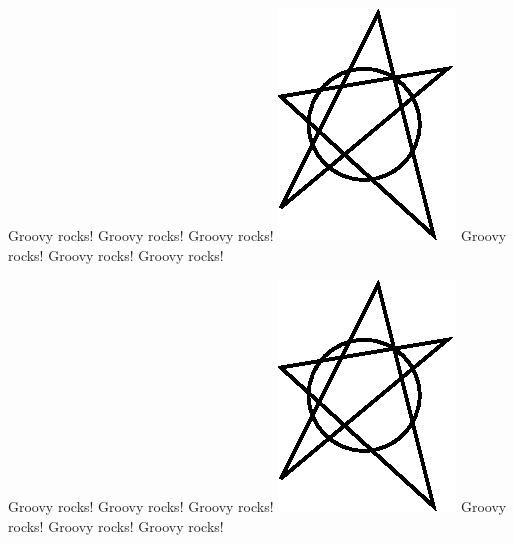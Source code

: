 \documentclass{article}
\begin{document}
Groovy rocks!
Groovy rocks!
Groovy rocks!
\includegraphics{demo}
Groovy rocks!
Groovy rocks!
Groovy rocks!

Groovy rocks!
Groovy rocks!
Groovy rocks!
\includegraphics[scale=2,angle=45]{demo}
Groovy rocks!
Groovy rocks!
Groovy rocks!
\end{document}
